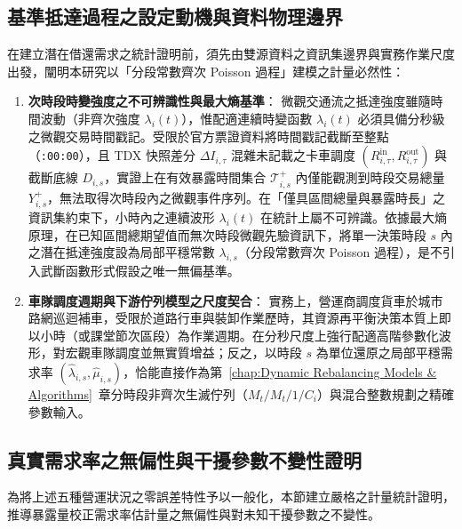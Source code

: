 \subsection{基準抵達過程之設定動機與資料物理邊界}\label{subsec:poisson_data_boundary}

在建立潛在借還需求之統計證明前，須先由雙源資料之資訊集邊界與實務作業尺度出發，闡明本研究以「分段常數齊次 Poisson 過程」建模之計量必然性：

\begin{enumerate}
    \item \textbf{次時段時變強度之不可辨識性與最大熵基準}：
    微觀交通流之抵達強度雖隨時間波動（非齊次強度 $\lambda_i(t)$），惟配適連續時變函數 $\lambda_i(t)$ 必須具備分秒級之微觀交易時間戳記。受限於官方票證資料將時間戳記截斷至整點（\texttt{:00:00}），且 TDX 快照差分 $\Delta I_{i,\tau}$ 混雜未記載之卡車調度 $(R^{\text{in}}_{i,\tau}, R^{\text{out}}_{i,\tau})$ 與截斷底線 $D_{i,s}$，實證上在有效暴露時間集合 $\mathcal{T}^+_{i,s}$ 內僅能觀測到時段交易總量 $Y^+_{i,s}$，無法取得次時段內之微觀事件序列。在「僅具區間總量與暴露時長」之資訊集約束下，小時內之連續波形 $\lambda_i(t)$ 在統計上屬不可辨識。依據最大熵原理，在已知區間總期望值而無次時段微觀先驗資訊下，將單一決策時段 $s$ 內之潛在抵達強度設為局部平穩常數 $\lambda_{i,s}$（分段常數齊次 Poisson 過程），是不引入武斷函數形式假設之唯一無偏基準。

    \item \textbf{車隊調度週期與下游佇列模型之尺度契合}：
    實務上，營運商調度貨車於城市路網巡迴補車，受限於道路行車與裝卸作業歷時，其資源再平衡決策本質上即以小時（或課堂節次區段）為作業週期。在分秒尺度上強行配適高階參數化波形，對宏觀車隊調度並無實質增益；反之，以時段 $s$ 為單位還原之局部平穩需求率 $\left(\hat{\lambda}_{i,s}, \hat{\mu}_{i,s}\right)$，恰能直接作為第~\ref{chap:Dynamic Rebalancing Models & Algorithms}~章分時段非齊次生滅佇列（$M_t/M_t/1/C_i$）與混合整數規劃之精確參數輸入。
\end{enumerate}

\subsection{真實需求率之無偏性與干擾參數不變性證明}

為將上述五種營運狀況之零誤差特性予以一般化，本節建立嚴格之計量統計證明，推導暴露量校正需求率估計量之無偏性與對未知干擾參數之不變性。

